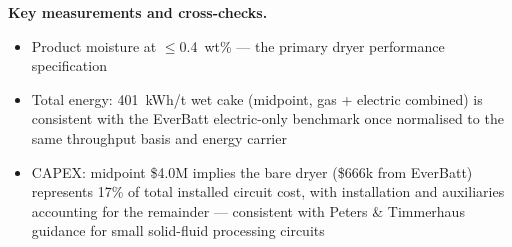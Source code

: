 \documentclass{article}
\renewcommand\_{\textunderscore\allowbreak}
\begin{document}
\medskip
\noindent\textbf{Key measurements and cross-checks.}\quad
\begin{itemize}[noitemsep]
	\item Product moisture at $\leq$0.4~wt\% --- the primary dryer performance specification
	\item Total energy: 401~kWh/t wet cake (midpoint, gas + electric combined) is consistent with the EverBatt electric-only benchmark once normalised to the same throughput basis and energy carrier
	\item CAPEX: midpoint \$4.0M implies the bare dryer (\$666k from EverBatt) represents 17\% of total installed circuit cost, with installation and auxiliaries accounting for the remainder --- consistent with Peters \& Timmerhaus guidance for small solid-fluid processing circuits
\end{itemize}
\end{document}
